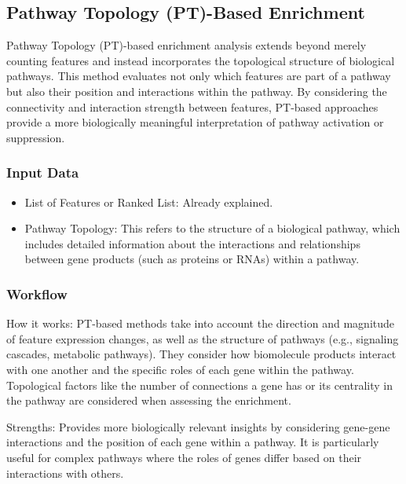 \documentclass[
]{book}
\providecommand{\tightlist}{%
  \setlength{\itemsep}{0pt}\setlength{\parskip}{0pt}}
\begin{document}
\hypertarget{pathway-topology-pt-based-enrichment}{%
\subsection{Pathway Topology (PT)-Based Enrichment}\label{pathway-topology-pt-based-enrichment}}

Pathway Topology (PT)-based enrichment analysis extends beyond merely counting features and instead incorporates the topological structure of biological pathways. This method evaluates not only which features are part of a pathway but also their position and interactions within the pathway. By considering the connectivity and interaction strength between features, PT-based approaches provide a more biologically meaningful interpretation of pathway activation or suppression.

\hypertarget{input-data-2}{%
\subsubsection{Input Data}\label{input-data-2}}

\begin{itemize}
\tightlist
\item
  {List of Features or Ranked List:} Already explained.
\item
  {Pathway Topology:} This refers to the structure of a biological pathway, which includes detailed information about the interactions and relationships between gene products (such as proteins or RNAs) within a pathway.
\end{itemize}

\hypertarget{workflow-2}{%
\subsubsection{Workflow}\label{workflow-2}}

{How it works}: PT-based methods take into account the direction and magnitude of feature expression changes, as well as the structure of pathways (e.g., signaling cascades, metabolic pathways). They consider how biomolecule products interact with one another and the specific roles of each gene within the pathway. Topological factors like the number of connections a gene has or its centrality in the pathway are considered when assessing the enrichment.

{Strengths}: Provides more biologically relevant insights by considering gene-gene interactions and the position of each gene within a pathway. It is particularly useful for complex pathways where the roles of genes differ based on their interactions with others.
\end{document}
